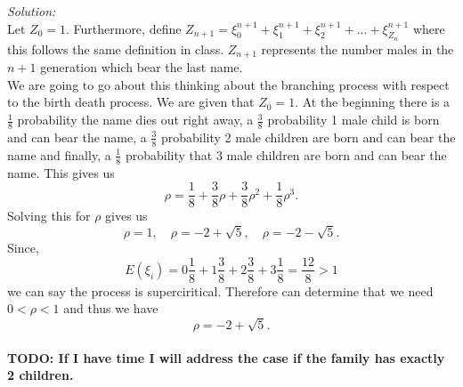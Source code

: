 \documentclass[10pt]{amsart}
\begin{document}
\noindent
\textit{Solution:} \\
Let $Z_0 = 1$.
Furthermore, define $Z_{n+1} = \xi_0^{n + 1} + \xi_1^{n + 1} + \xi_2^{n + 1} + ... + \xi_{Z_n}^{n + 1}$ where this follows the same definition in class.
$Z_{n+1}$ represents the number males in the $n+1$ generation which bear the last name. \\

\noindent
We are going to go about this thinking about the branching process with respect to the birth death process.
We are given that $Z_0 = 1$. 
At the beginning there is a $\frac 1 8$ probability the name dies out right away, a $\frac 3 8$ probability 1 male child is born and can bear the name, a $\frac 3 8$ probability 2 male children are born and can bear the name and finally, a $\frac 1 8$ probability that 3 male children are born and can bear the name.
This gives us
$$
\rho = \frac 1 8 + \frac 3 8 \rho + \frac 3 8 \rho^2 + \frac 1 8 \rho^3.
$$
Solving this for $\rho$ gives us
$$
\rho = 1, \quad \rho = -2 + \sqrt{5}, \quad \rho = -2 - \sqrt{5}.
$$
Since, $$E(\xi_i) = 0 \frac 1 8 + 1 \frac 3 8 + 2 \frac 3 8 + 3 \frac 1 8 = \frac {12} 8 > 1$$
we can say the process is superciritical.
Therefore can determine that we need $0 < \rho < 1$ and thus we have 
$$\rho = -2 + \sqrt{5}.$$
\\
\textbf{TODO: If I have time I will address the case if the family has exactly 2 children.}

\newpage
\end{document}
